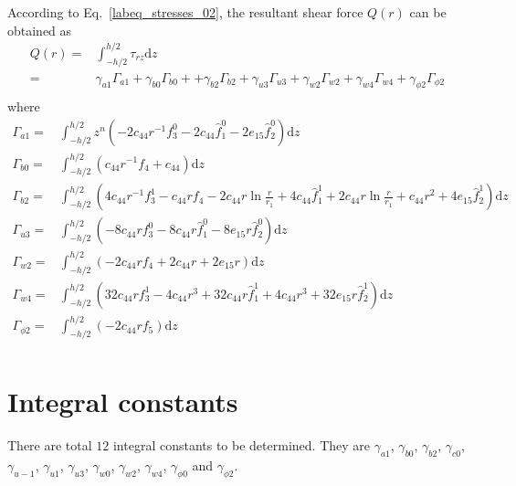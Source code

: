 \documentclass[12pt,sort&compress,fleqn,3p]{elsarticle}
\begin{document}
According to Eq.~\eqref{labeq_stresses_02}, the resultant shear force $Q(r)$ can be obtained as 
\begin{equation}\label{labeq_Q}
\begin{split}
Q(r)=&\int_{-h/2}^{h/2}\tau_{rz}\mathrm{d}z\\
 =& \gamma_{a1}\Gamma_{a1} +\gamma_{b0}\Gamma_{b0}+ +\gamma_{b2}\Gamma_{b2} +\gamma_{u3}\Gamma_{u3}   +\gamma_{w2}\Gamma_{w2}+\gamma_{w4}\Gamma_{w4} +\gamma_{\phi 2}\Gamma_{\phi 2} \\
\end{split}
\end{equation}
where
\begin{equation}\label{labeq_Q_Gamma}
\begin{split}
\Gamma_{a1}= &\int_{-h/2}^{h/2}z^{n}( -2c_{44} r^{-1}f^0_3  - 2c_{44}\hat{f}^0_1 - 2e_{15}\hat{f}^0_2 )\mathrm{d}z\\
\Gamma_{b0}= &\int_{-h/2}^{h/2}( c_{44}r^{-1}f_4    +  c_{44}    )\mathrm{d}z\\
\Gamma_{b2}=&\int_{-h/2}^{h/2}( 4c_{44}r^{-1}f^1_3- c_{44}rf_4 -2c_{44}r\ln\frac{r}{r_1}  +   4 c_{44} \hat{f}^1_1  +   2c_{44}r\ln\frac{r}{r_1}  +   c_{44}r^2  +  4e_{15}\hat{f}^1_2 )\mathrm{d}z\\
\Gamma_{u3} =&\int_{-h/2}^{h/2}( -8c_{44}rf^0_3  - 8c_{44} r \hat{f}^0_1 - 8e_{15}r\hat{f}^0_2 )\mathrm{d}z\\
\Gamma_{w2} =&\int_{-h/2}^{h/2}( -2c_{44}rf_4  +  2c_{44}r + 2e_{15}r  )\mathrm{d}z\\
\Gamma_{w4}=&\int_{-h/2}^{h/2}( 32c_{44}rf^1_3 -4c_{44}r^3 +   32c_{44}r\hat{f}^1_1 + 4c_{44}r^3  + 32e_{15}r\hat{f}^1_2     )\mathrm{d}z\\
\Gamma_{\phi2} =&\int_{-h/2}^{h/2}( -2c_{44}rf_5   )\mathrm{d}z\\
\end{split}
\end{equation}




\section{Integral constants}

There are total $12$ integral constants to be determined. They are $\gamma_{a1}$,  $\gamma_{b0}$, $\gamma_{b2}$, $\gamma_{c0}$,
$\gamma_{u-1}$, $\gamma_{u1}$, $\gamma_{u3}$, $\gamma_{w0}$, $\gamma_{w2}$, $\gamma_{w4}$, $\gamma_{\phi0}$  and  $\gamma_{\phi 2}$.
\end{document}
